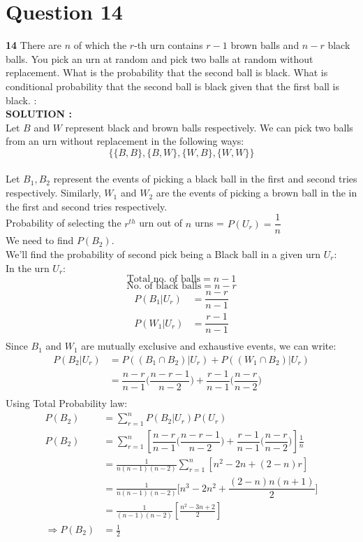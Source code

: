 \documentclass{article}
\begin{document}
\section{Question 14}
\label{Q14}
\textbf{14} There are $n$ of which the $r$-th urn contains $r - 1$ brown balls and $n - r$ black balls. You pick an urn at random and pick two balls at random without replacement. What is the probability that the second ball is black. What is conditional probability that the second ball is black given that the first ball is black.  : \\


\hspace{1em} \large{\textbf{SOLUTION :}} \\
    Let $B$ and $W$ represent black and brown balls respectively.
    We can pick two balls from an urn without replacement in the following ways:\\ 
    $$\{\{B,B\},\{B,W\},\{W,B\},\{W,W\}\}$$\\
    Let $B_1,B_2$ represent the events of picking a black ball in the first and second tries respectively. Similarly, ${W_1}$ and ${W_2}$ are the events of picking a brown ball in the in the first and second tries respectively.\\
    Probability of selecting the $r^{th}$ urn out of $n$ urns = $P(U_r)=\dfrac{1}{n}$\\
    We need to find $P(B_2)$.\\
    We'll find the probability of second pick being a Black ball in a given urn $U_r$:\\
    In the urn $U_r$:\\
    $$\text{Total no. of balls} = n-1$$
    $$\text{No. of black balls} = n-r$$
\begin{align*}
    P(B_1|U_r)&=\dfrac{n-r}{n-1}\\
    P(W_1|U_r)&=\dfrac{r-1}{n-1}\\
\end{align*}
    Since $B_1$ and $W_1$ are mutually exclusive and exhaustive events, we can write:
\begin{align}
    P(B_2|U_r)&=P((B_1\cap B_2)|U_r) + P((W_1\cap B_2)|U_r)\\
    &=\dfrac{n-r}{n-1}\Big(\dfrac{n-r-1}{n-2}\Big) 
    + \dfrac{r-1}{n-1}\Big(\dfrac{n-r}{n-2}\Big)\\
\end{align}
Using Total Probability law:
\begin{align*}
    P(B_2)&=\sum^n_{r=1}P(B_2|U_r)P(U_r)\\
    P(B_2)&=\sum^n_{r=1}\left[\dfrac{n-r}{n-1}\Big(\dfrac{n-r-1}{n-2}\Big)
    + \dfrac{r-1}{n-1}\Big(\dfrac{n-r}{n-2}\Big)\right]\frac{1}{n}\\
    &=\frac{1}{n(n-1)(n-2)}\sum^n_{r=1}[n^2-2n+(2-n)r]\\
    &=\frac{1}{n(n-1)(n-2)}\Big[n^3-2n^2+\dfrac{(2-n)n(n+1)}{2}\Big]\\
    &=\frac{1}{(n-1)(n-2)}\left[\frac{n^2-3n+2}{2}\right]\\
  \Rightarrow P(B_2) &=\frac{1}{2}
\end{align*}
\end{document}
